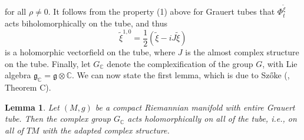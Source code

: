 \documentclass[12pt,reqno]{amsart}\usepackage{amssymb,amsmath,amscd,epsfig,amsthm,enumerate,import,eufrak}
\newtheorem{lemma}[theorem]{Lemma}
\theoremstyle{definition}
\theoremstyle{remark}
\numberwithin{equation}{section}
\theoremstyle{plain}
\theoremstyle{definition}
\def \c {\mathbb{C}}
\def \vs {\vskip 2mm}
\theoremstyle{remark}
\numberwithin{theorem}{section}
\begin{document}
%
for all $\rho \neq 0.$
\vs
It follows from the property (1) above for Grauert tubes that $\Phi^{\tilde{\xi}}_t$ acts biholomorphically on the tube, and thus
%
\[
	\tilde{\xi}^{1,0} = \frac12 (\tilde{\xi} - i J \tilde{\xi})
\]
%
is a holomorphic vectorfield on the tube, where $J$ is the almost complex structure on the tube. 
\vs
Finally, let $G_{\c}$ denote the complexification of the group $G$, with Lie algebra $\mathfrak{g}_{\c} = \mathfrak{g} \otimes \c$. We can now state the first lemma, which is due to Sz\H{o}ke (\cite{s3}, Theorem C).
\vs
\begin{lemma} \label{lemma:action}
Let $(M, g)$ be a compact Riemannian manifold with entire Grauert tube. Then the complex group $G_{\c}$ acts holomorphically on all of the tube, i.e., on all of $TM$ with the adapted complex structure.
\end{lemma}
%
%
%
%
%
%
\iffalse
%
%
%
%
%
\end{document}
